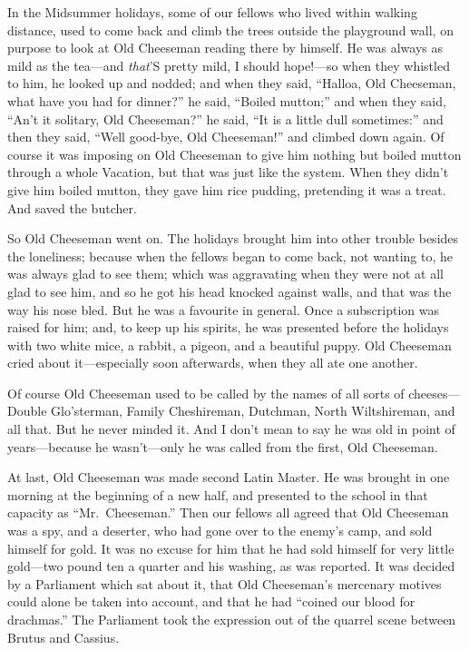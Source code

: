 In the Midsummer holidays, some of our fellows who lived within
walking distance, used to come back and climb the trees outside the
playground wall, on purpose to look at Old Cheeseman reading there
by himself.  He was always as mild as the tea---and \emph{that}'S pretty
mild, I should hope!---so when they whistled to him, he looked up and
nodded; and when they said, ``Halloa, Old Cheeseman, what have you
had for dinner?'' he said, ``Boiled mutton;'' and when they said, ``An't
it solitary, Old Cheeseman?'' he said, ``It is a little dull
sometimes:'' and then they said, ``Well good-bye, Old Cheeseman!'' and
climbed down again.  Of course it was imposing on Old Cheeseman to
give him nothing but boiled mutton through a whole Vacation, but
that was just like the system.  When they didn't give him boiled
mutton, they gave him rice pudding, pretending it was a treat.  And
saved the butcher.

So Old Cheeseman went on.  The holidays brought him into other
trouble besides the loneliness; because when the fellows began to
come back, not wanting to, he was always glad to see them; which was
aggravating when they were not at all glad to see him, and so he got
his head knocked against walls, and that was the way his nose bled.
But he was a favourite in general.  Once a subscription was raised
for him; and, to keep up his spirits, he was presented before the
holidays with two white mice, a rabbit, a pigeon, and a beautiful
puppy.  Old Cheeseman cried about it---especially soon afterwards,
when they all ate one another.

Of course Old Cheeseman used to be called by the names of all sorts
of cheeses---Double Glo'sterman, Family Cheshireman, Dutchman, North
Wiltshireman, and all that.  But he never minded it.  And I don't
mean to say he was old in point of years---because he wasn't---only he
was called from the first, Old Cheeseman.

At last, Old Cheeseman was made second Latin Master.  He was brought
in one morning at the beginning of a new half, and presented to the
school in that capacity as ``Mr.\ Cheeseman.''  Then our fellows all
agreed that Old Cheeseman was a spy, and a deserter, who had gone
over to the enemy's camp, and sold himself for gold.  It was no
excuse for him that he had sold himself for very little gold---two
pound ten a quarter and his washing, as was reported.  It was
decided by a Parliament which sat about it, that Old Cheeseman's
mercenary motives could alone be taken into account, and that he had
``coined our blood for drachmas.''  The Parliament took the expression
out of the quarrel scene between Brutus and Cassius.

